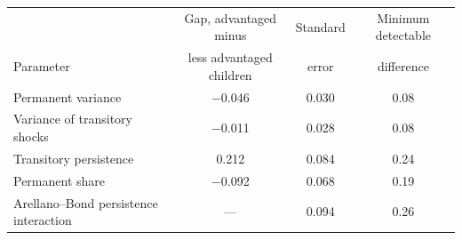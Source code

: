 \begin{tabular}{@{}lccc@{}}
\toprule
 & Gap, advantaged minus & Standard & Minimum detectable \\
Parameter & less advantaged children & error & difference \\
\midrule
Permanent variance & $-$0.046 & 0.030 & 0.08 \\
Variance of transitory shocks & $-$0.011 & 0.028 & 0.08 \\
Transitory persistence & 0.212 & 0.084 & 0.24 \\
Permanent share & $-$0.092 & 0.068 & 0.19 \\
Arellano--Bond persistence interaction & --- & 0.094 & 0.26 \\
\bottomrule
\end{tabular}
